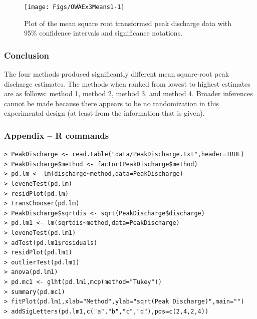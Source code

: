 \documentclass[10pt,openany]{book}\usepackage[]{graphicx}\usepackage[]{color}
\newenvironment{knitrout}{}{} %
\begin{document}
\begin{knitrout}
\color{fgcolor}\begin{figure}[hbtp]

{\centering \texttt{[image: Figs/OWAEx3Means1-1]} 

}

\caption[Plot of the mean square root transformed peak discharge data with 95\% confidence intervals and significance notations]{Plot of the mean square root transformed peak discharge data with 95\% confidence intervals and significance notations.}\label{fig:OWAEx3Means1}
\end{figure}


\end{knitrout}

\subsubsection*{Conclusion}
The four methods produced significantly different mean square-root peak discharge estimates.  The methods when ranked from lowest to highest estimates are as follows: method 1, method 2, method 3, and method 4.  Broader inferences cannot be made because there appears to be no randomization in this experimental design (at least from the information that is given).

\newpage
\subsubsection*{Appendix -- R commands}
\begin{Verbatim}[formatcom=\color{red},xleftmargin=5mm,commandchars=\\\{\}]
> PeakDischarge <- read.table("data/PeakDischarge.txt",header=TRUE)
> PeakDischarge$method <- factor(PeakDischarge$method)
> pd.lm <- lm(discharge~method,data=PeakDischarge)
> leveneTest(pd.lm)
> residPlot(pd.lm)
> transChooser(pd.lm)
> PeakDischarge$sqrtdis <- sqrt(PeakDischarge$discharge)
> pd.lm1 <- lm(sqrtdis~method,data=PeakDischarge)
> leveneTest(pd.lm1)
> adTest(pd.lm1$residuals)
> residPlot(pd.lm1)
> outlierTest(pd.lm1)
> anova(pd.lm1)
> pd.mc1 <- glht(pd.lm1,mcp(method="Tukey"))
> summary(pd.mc1)
> fitPlot(pd.lm1,xlab="Method",ylab="sqrt(Peak Discharge)",main="")
> addSigLetters(pd.lm1,c("a","b","c","d"),pos=c(2,4,2,4))
\end{Verbatim}


\end{document}
